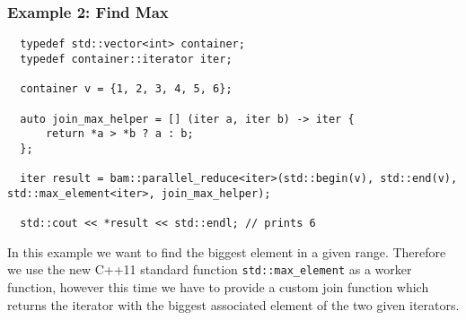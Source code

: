 \documentclass[11pt, a4paper]{article}
\begin{document}
\subsubsection{Example 2: Find Max}
\begin{lstlisting}
  typedef std::vector<int> container;
  typedef container::iterator iter;

  container v = {1, 2, 3, 4, 5, 6};

  auto join_max_helper = [] (iter a, iter b) -> iter {
      return *a > *b ? a : b;
  };

  iter result = bam::parallel_reduce<iter>(std::begin(v), std::end(v), std::max_element<iter>, join_max_helper);

  std::cout << *result << std::endl; // prints 6
\end{lstlisting}

In this example we want to find the biggest element in a given range. Therefore we use the new C++11 standard function \texttt{std::max\_element} as a worker function, however this time we have to provide a custom join function which returns the iterator with the biggest associated element of the two given iterators.
\end{document}
